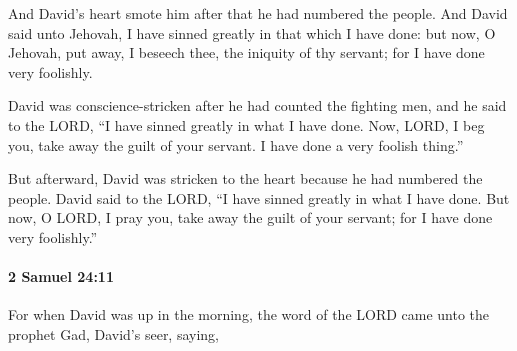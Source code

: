 			\begin{versebox}
					\item[BHS] 
					\item[ASV] And David's heart smote him after that he had numbered the people. And David said unto Jehovah, I have sinned greatly in that which I have done: but now, O Jehovah, put away, I beseech thee, the iniquity of thy servant; for I have done very foolishly.
					\item[NIV] David was conscience-stricken after he had counted the fighting men, and he said to the LORD, “I have sinned greatly in what I have done. Now, LORD, I beg you, take away the guilt of your servant. I have done a very foolish thing.”
					\item[NRSV] But afterward, David was stricken to the heart because he had numbered the people. David said to the LORD, “I have sinned greatly in what I have done. But now, O LORD, I pray you, take away the guilt of your servant; for I have done very foolishly.”
			\end{versebox}

		\paragraph{2 Samuel 24:11} %
			\label{2SAMUEL-24-11}

			For when David was up in the morning, the word of the LORD came unto the prophet Gad, David’s seer, saying,

